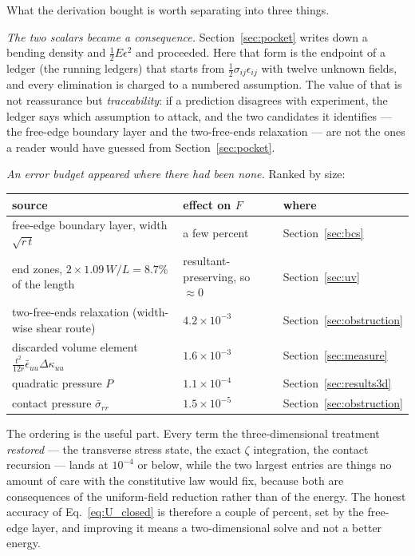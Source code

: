 \documentclass[11pt]{article}
\begin{document}
What the derivation bought is worth separating into three things.

\emph{The two scalars became a consequence.} Section~\ref{sec:pocket} writes
down a bending density and $\tfrac12 E\epsilon^{2}$ and proceeded. Here that form
is the endpoint of a ledger (the running ledgers) that starts from
$\tfrac12\sigma_{ij}\epsilon_{ij}$ with twelve unknown fields, and every
elimination is charged to a numbered assumption. The value of that is not
reassurance but \emph{traceability}: if a prediction disagrees with experiment,
the ledger says which assumption to attack, and the two candidates it identifies
--- the free-edge boundary layer and the two-free-ends relaxation --- are not the
ones a reader would have guessed from Section~\ref{sec:pocket}.

\emph{An error budget appeared where there had been none.} Ranked by size:
\begin{center}
\begin{tabular}{lll}
\toprule
source & effect on $F$ & where\\
\midrule
free-edge boundary layer, width $\sqrt{r\,t}$
  & a few percent & Section~\ref{sec:bcs}\\
end zones, $2\times1.09\,W/L = 8.7\%$ of the length
  & resultant-preserving, so $\approx 0$
  & Section~\ref{sec:uv}\\
two-free-ends relaxation (width-wise shear route)
  & $4.2\times10^{-3}$ & Section~\ref{sec:obstruction}\\
discarded volume element $\frac{t^{2}}{12r}
  \bar\epsilon_{uu}\Delta\kappa_{uu}$
  & $1.6\times10^{-3}$ & Section~\ref{sec:measure}\\
quadratic pressure $P$ & $1.1\times10^{-4}$
  & Section~\ref{sec:results3d}\\
contact pressure $\bar\sigma_{rr}$ & $1.5\times10^{-5}$
  & Section~\ref{sec:obstruction}\\
\bottomrule
\end{tabular}
\end{center}
The ordering is the useful part. Every term the three-dimensional treatment
\emph{restored} --- the transverse stress state, the exact $\zeta$ integration,
the contact recursion --- lands at $10^{-4}$ or below, while the two largest
entries are things no amount of care with the constitutive law would fix, because
both are consequences of the uniform-field reduction rather than of the energy.
The honest accuracy of Eq.~\eqref{eq:U_closed} is therefore a couple of percent,
set by the free-edge layer, and improving it means a two-dimensional solve and
not a better energy.
\end{document}
